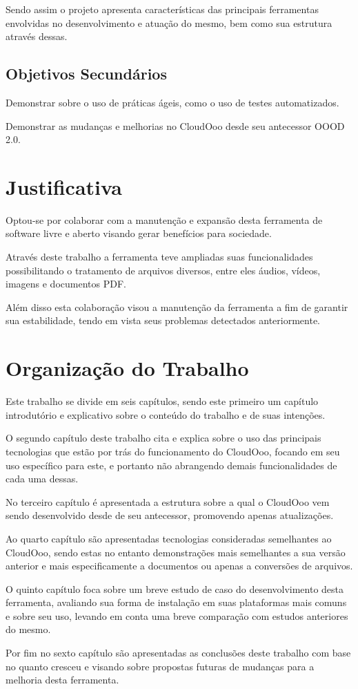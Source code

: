 Sendo assim o projeto apresenta características das principais ferramentas envolvidas no desenvolvimento e atuação do mesmo, bem como sua estrutura através dessas.

\subsection{Objetivos Secundários}

Demonstrar sobre o uso de práticas ágeis, como o uso de testes automatizados.

Demonstrar as mudanças e melhorias no CloudOoo desde seu antecessor OOOD 2.0.


\section{Justificativa}

Optou-se por colaborar com a manutenção e expansão desta ferramenta de software livre e aberto visando gerar benefícios para sociedade.

Através deste trabalho a ferramenta teve ampliadas suas funcionalidades possibilitando o tratamento de arquivos diversos, entre eles áudios, vídeos, imagens e documentos PDF.

Além disso esta colaboração visou a manutenção da ferramenta a fim de garantir sua estabilidade, tendo em vista seus problemas detectados anteriormente. 

\section{Organização do Trabalho}

Este trabalho se divide em seis capítulos, sendo este primeiro um capítulo introdutório e explicativo sobre o conteúdo do trabalho e de suas intenções.

O segundo capítulo deste trabalho cita e explica sobre o uso das principais tecnologias que estão por trás do funcionamento do CloudOoo, focando em seu uso específico para este, e portanto não abrangendo demais funcionalidades de cada uma dessas.

No terceiro capítulo é apresentada a estrutura sobre a qual o CloudOoo vem sendo desenvolvido desde de seu antecessor, promovendo apenas  atualizações.

Ao quarto capítulo são apresentadas tecnologias consideradas semelhantes ao CloudOoo, sendo estas no entanto demonstrações mais semelhantes a sua versão anterior e mais especificamente a documentos ou apenas a conversões de arquivos.

O quinto capítulo foca sobre um breve estudo de caso do desenvolvimento desta ferramenta, avaliando sua forma de instalação em suas plataformas mais comuns e sobre seu uso, levando em conta uma breve comparação com estudos anteriores do mesmo.

Por fim no sexto capítulo são apresentadas as conclusões deste trabalho com base no quanto cresceu e visando sobre propostas futuras de mudanças para a melhoria desta ferramenta.
